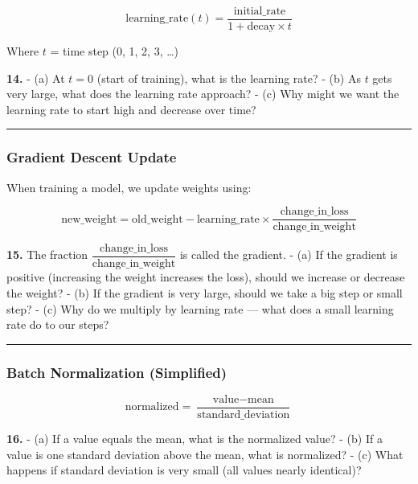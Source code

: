 \documentclass[
  11pt,
]{article}
\begin{document}
\[\text{learning\_rate}(t) = \dfrac{\text{initial\_rate}}{1 + \text{decay} \times t}\]

Where \(t\) = time step (0, 1, 2, 3, \ldots)

\textbf{14.} - (a) At \(t = 0\) (start of training), what is the
learning rate? - (b) As \(t\) gets very large, what does the learning
rate approach? - (c) Why might we want the learning rate to start high
and decrease over time?

\begin{center}\rule{0.5\linewidth}{0.5pt}\end{center}

\hypertarget{gradient-descent-update}{%
\subsubsection{Gradient Descent Update}\label{gradient-descent-update}}

When training a model, we update weights using:

\[\text{new\_weight} = \text{old\_weight} - \text{learning\_rate} \times \dfrac{\text{change\_in\_loss}}{\text{change\_in\_weight}}\]

\textbf{15.} The fraction
\(\dfrac{\text{change\_in\_loss}}{\text{change\_in\_weight}}\) is called
the gradient. - (a) If the gradient is positive (increasing the weight
increases the loss), should we increase or decrease the weight? - (b) If
the gradient is very large, should we take a big step or small step? -
(c) Why do we multiply by learning rate --- what does a small learning
rate do to our steps?

\begin{center}\rule{0.5\linewidth}{0.5pt}\end{center}

\hypertarget{batch-normalization-simplified}{%
\subsubsection{Batch Normalization
(Simplified)}\label{batch-normalization-simplified}}

\[\text{normalized} = \dfrac{\text{value} - \text{mean}}{\text{standard\_deviation}}\]

\textbf{16.} - (a) If a value equals the mean, what is the normalized
value? - (b) If a value is one standard deviation above the mean, what
is normalized? - (c) What happens if standard deviation is very small
(all values nearly identical)?
\end{document}
